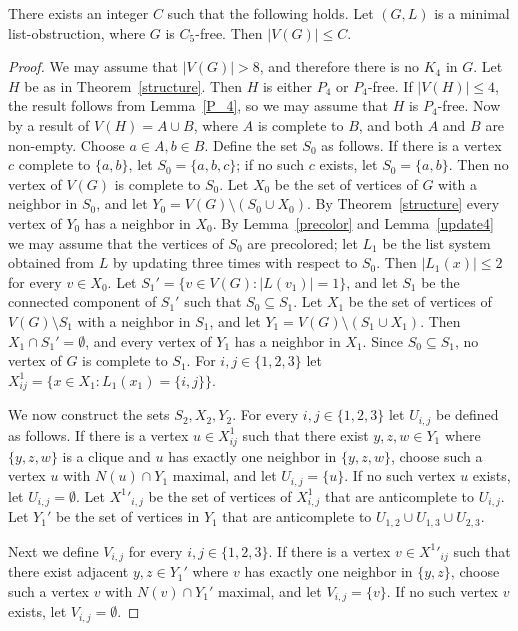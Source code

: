 \documentclass[11pt]{article}
\begin{document}
\begin{claim}\label{c5free}
There exists an integer $C$ such that the following holds. 
Let  $(G,L)$ is a minimal list-obstruction, where $G$ is $C_5$-free.
Then  $|V(G)| \leq C$.
\end{claim}
\begin{proof}
We may assume that $|V(G)|>8$, and therefore there is no $K_4$ in $G$.
Let $H$ be as in Theorem~\ref{structure}. Then $H$ is either $P_4$ or $P_4$-free.  If $|V(H)| \leq 4$, the result follows from Lemma~\ref{P_4}, so we may assume that $H$ is $P_4$-free. Now by a result of \cite{Scheische} $V(H)=A \cup B$,
where $A$ is complete to $B$, and both $A$ and $B$ are non-empty.
Choose $a \in A, b \in B$. Define the set $S_0$ as follows. If there is a vertex $c$ complete to $\{a,b\}$, let $S_0=\{a,b,c\}$; if no such $c$ exists, let
$S_0=\{a,b\}$. Then no vertex of $V(G)$ is complete to $S_0$. Let $X_0$ be the set of vertices of $G$ with a neighbor in $S_0$, and let $Y_0=V(G) \setminus (S_0 \cup X_0)$. By Theorem~\ref{structure} every vertex of $Y_0$ has a neighbor in $X_0$. By Lemma~\ref{precolor} and Lemma~\ref{update4} we may assume that the vertices of $S_0$ are precolored; let $L_1$ be the list system obtained from $L$ by updating three times with respect to $S_0$. Then $|L_1(x)| \leq 2$
for every $v \in X_0$. Let $S_1'=\{v \in V(G) : |L(v_1)|=1\}$, and
let $S_1$ be the connected component of $S_1'$ such that $S_0 \subseteq S_1$.
Let  $X_1$ be the set of vertices of $V(G) \setminus S_1$ with a neighbor in $S_1$,  and
let $Y_1=V(G) \setminus (S_1 \cup X_1)$. Then $X_1 \cap S_1' = \emptyset$, and
every vertex of $Y_1$ has a 
neighbor in $X_1$. Since $S_0 \subseteq S_1$, no vertex of $G$ is complete to 
$S_1$. For $i,j \in \{1,2,3\}$ let $X_{ij}^1=\{x \in X_1: L_1(x_1)=\{i,j\}\}$.

We now construct the sets $S_2,X_2,Y_2$.
For every $i,j \in \{1,2,3\}$ let
$U_{i,j}$ be defined as follows. If there is a vertex $u \in X^1_{ij}$  
such that there exist $y,z,w \in Y_1$ where $\{y,z,w\}$ is a clique and
$u$ has exactly one neighbor in $\{y,z,w\}$, choose such a vertex $u$
with $N(u) \cap Y_1$ maximal, and let $U_{i,j}=\{u\}$. If no such vertex $u$
exists, let $U_{i,j}=\emptyset$. Let ${X^1}'_{i,j}$ be the set of vertices of
$X^1_{i,j}$ that are anticomplete to $U_{i,j}$.
Let $Y_1'$ be the set of vertices in $Y_1$
that are anticomplete to $U_{1,2} \cup U_{1,3} \cup U_{2,3}$.

Next we define $V_{i,j}$ for every $i,j \in \{1,2,3\}$. If there is a vertex 
$v \in {X^1}'_{ij}$  
such that there exist adjacent $y,z\in Y_1'$ 
where  $v$ has exactly one neighbor in $\{y,z\}$, choose such a vertex $v$
with $N(v) \cap Y_1'$ maximal, and let $V_{i,j}=\{v\}$. If no such vertex $v$
exists, let $V_{i,j}=\emptyset$. 


\end{proof}
\end{document}
